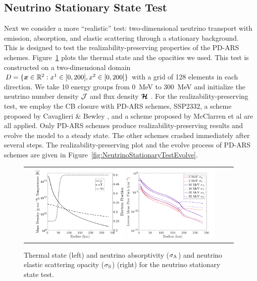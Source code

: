 \subsection{Neutrino Stationary State Test} \label{se: Neutrino Stationary State Test}
Next we consider a more ``realistic'' test: two-dimensional neutrino transport with emission, absorption, and elastic scattering through a stationary background.
This is designed to test the realizability-preserving properties of the PD-ARS schemes.
Figure~\ref{fig:NeutrinoStationaryTestEOS} plots the thermal state and the opacities we used.
This test is constructed on a two-dimensional domain $D=\{\boldsymbol{x}\in\mathbb{R}^{2}:x^{1}\in[0,200], x^{2}\in[0,200]\}$ with a grid of 128 elements in each direction.
We take 10 energy groups from 0~MeV to 300~MeV and initialize the neutrino number density $\mathcal{J}$ and flux density $\boldsymbol{\mathcal{H}}$ .
For the realizability-preserving test, we employ the CB closure with PD-ARS schemes, SSP2332, a scheme proposed by Cavaglieri \& Bewley \cite{cavaglieriBewley2015}, and a scheme proposed by McClarren et al \cite{mcclarren_etal_2008} are all applied.
Only PD-ARS schemes produce realizability-preserving results and evolve the model to a steady state.
The other schemes crashed immediately after several steps.
The realizability-preserving plot and the evolve process of PD-ARS schemes are given in Figure~\ref{fig:NeutrinoStationaryTestEvolve}. 

\begin{figure}[h]
  \centering
  \begin{tabular}{cc}
    \includegraphics[width=0.45\textwidth]{figures/NStatinaryS_EOS}
    \includegraphics[width=0.45\textwidth]{figures/NSS_Opacities}
  \end{tabular}
   \caption{Thermal state (left) and neutrino absorptivity ($\sigma_{{\rm A}}$) and neutrino elastic scattering opacity ($ \sigma_{{\rm S}}$) (right) for the neutrino stationary state test.}
   \label{fig:NeutrinoStationaryTestEOS}
\end{figure}

